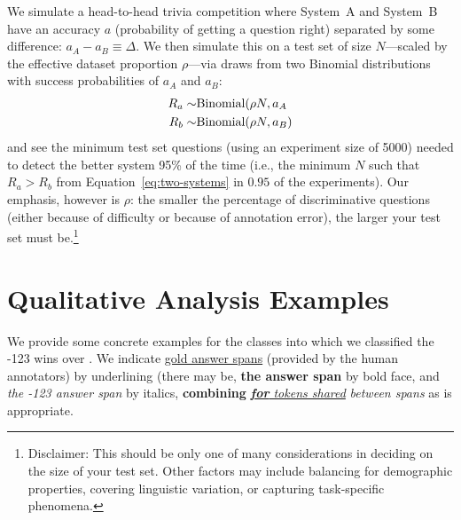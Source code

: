 We simulate a head-to-head trivia competition where System~A and System~B have an accuracy $a$ (probability of getting a question right) separated by some difference: $a_A - a_B \equiv \Delta$.
We then simulate this on a test set of size $N$---scaled by the
effective dataset proportion $\rho$---via draws from two Binomial
distributions with success probabilities of $a_{A}$ and $a_{B}$:
\begin{align}
    R_a \sim & \mbox{Binomial}(\rho N, a_A \notag \\
    R_b \sim & \mbox{Binomial}(\rho N, a_B)
    \label{eq:two-systems}
\end{align}
and see the minimum test set questions (using an experiment size of 5000) needed to detect the better system 95\% of the time (i.e., the minimum $N$ such that $R_a > R_b$ from Equation~\ref{eq:two-systems} in $0.95$ of the experiments).
Our emphasis, however is $\rho$: the smaller the percentage of discriminative questions (either because of difficulty or because of annotation error), the larger your test set must be.\footnote{Disclaimer: This should be only one of many considerations in deciding on the size of your test set.  Other factors may include balancing for demographic properties, covering linguistic variation, or capturing task-specific phenomena.}

\section{Qualitative Analysis Examples}
\label{sec:qualitative-analysis}

We provide some concrete examples for the classes into which we classified the
\xlnet{}-123 wins over \xlnet{}.  We indicate \underline{gold answer spans} (provided by the
human annotators) by underlining (there may be, \textbf{the \xlnet{} answer span} by bold face,
and \textit{the \xlnet{}-123 answer span} by italics, \textbf{combining} \underline{\textit{\textbf{for} tokens shared}} \textit{between spans} as is appropriate.

